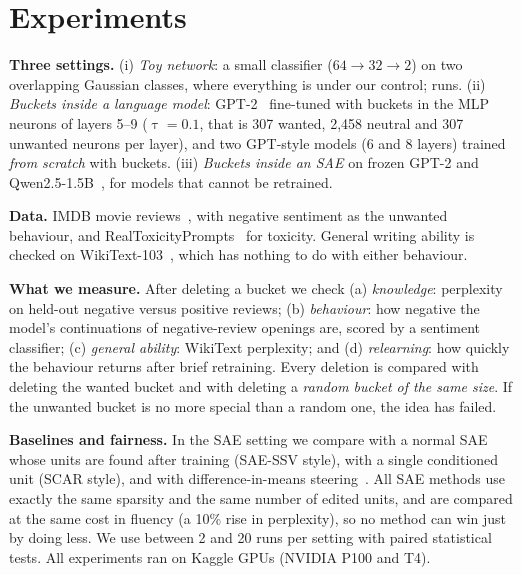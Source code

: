 \documentclass[11pt,a4paper]{article}
\begin{document}
\section{Experiments}

\textbf{Three settings.} (i) \emph{Toy network}: a small classifier ($64\!\to\!32\!\to\!2$) on two
overlapping Gaussian classes, where everything is under our control; \nSynthSeeds{} runs.
(ii) \emph{Buckets inside a language model}: GPT-2~\citep{radford2019gpt2} fine-tuned with buckets in
the MLP neurons of layers 5--9 ($\uptau=0.1$, that is 307 wanted, 2{,}458 neutral and 307 unwanted
neurons per layer), and two GPT-style models (6 and 8 layers) trained \emph{from scratch} with
buckets. (iii) \emph{Buckets inside an SAE} on frozen GPT-2 and Qwen2.5-1.5B~\citep{qwen2024qwen25},
for models that cannot be retrained.

\textbf{Data.} IMDB movie reviews~\citep{maas2011imdb}, with negative sentiment as the unwanted
behaviour, and RealToxicityPrompts~\citep{gehman2020rtp} for toxicity. General writing ability is
checked on WikiText-103~\citep{merity2017wikitext}, which has nothing to do with either behaviour.

\textbf{What we measure.} After deleting a bucket we check (a) \emph{knowledge}: perplexity on
held-out negative versus positive reviews; (b) \emph{behaviour}: how negative the model's
continuations of negative-review openings are, scored by a sentiment classifier; (c) \emph{general
ability}: WikiText perplexity; and (d) \emph{relearning}: how quickly the behaviour returns after
brief retraining. Every deletion is compared with deleting the wanted bucket and with deleting a
\emph{random bucket of the same size}. If the unwanted bucket is no more special than a random one,
the idea has failed.

\textbf{Baselines and fairness.} In the SAE setting we compare with a normal SAE whose units are found
after training (SAE-SSV style), with a single conditioned unit (SCAR style), and with
difference-in-means steering~\citep{rimsky2024caa,arditi2024refusal}. All SAE methods use exactly the
same sparsity and the same number of edited units, and are compared at the same cost in fluency
(a 10\% rise in perplexity), so no method can win just by doing less. We use between 2 and 20 runs per
setting with paired statistical tests. All experiments ran on Kaggle GPUs (NVIDIA P100 and T4).

\end{document}

